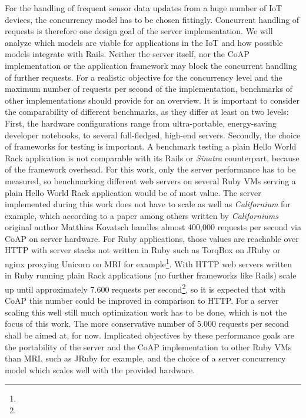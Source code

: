 		For the handling of frequent sensor data updates from a huge number of
		\ac{IoT} devices, the concurrency model has to be chosen fittingly.
		Concurrent handling of requests is therefore one design goal of the
		server implementation. We will analyze which models are viable for
		applications in the \ac{IoT} and how possible models integrate with
		\ac{Rails}. Neither the server itself, nor the \ac{CoAP} implementation
		or the application framework may block the concurrent handling of
		further requests. For a realistic objective for the concurrency level
		and the maximum number of requests per second of the implementation,
		benchmarks of other implementations should provide for an overview. It
		is important to consider the comparability of different benchmarks, as
		they differ at least on two levels: First, the hardware configurations
		range from ultra-portable, energy-saving developer notebooks, to
		several full-fledged, high-end servers. Secondly, the choice of
		frameworks for testing is important. A benchmark testing a plain Hello
		World Rack application is not comparable with its \ac{Rails} or
		\emph{Sinatra} counterpart, because of the framework overhead. For this
		work, only the server performance has to be measured, so benchmarking
		different web servers on several Ruby VMs serving a plain Hello World
		Rack application would be of most value. The server implemented during
		this work does not have to scale as well as \emph{Californium} for
		example, which according to a paper among others written by
		\emph{Californiums} original author Matthias Kovatsch handles almost
		400,000 requests per second \cite{cf-scale} via \ac{CoAP} on server
		hardware. For Ruby applications, those values are reachable over
		\ac{HTTP} with server stacks not written in Ruby such as TorqBox on
		JRuby or nginx proxying Unicorn on \ac{MRI} for
		example\footnote{\urlRubyWebBenchOne}. With \ac{HTTP} web servers
		written in Ruby running plain Rack applications (no further frameworks
		like \ac{Rails}) scale up until approximately 7.600 requests per
		second\footnote{\urlRubyWebBenchTwo}, so it is expected that with
		\ac{CoAP} this number could be improved in comparison to \ac{HTTP}. For
		a server scaling this well still much optimization work has to be done,
		which is not the focus of this work. The more conservative number of
		5.000 requests per second shall be aimed at, for now. Implicated
		objectives by these performance goals are the portability of the server
		and the \ac{CoAP} implementation to other Ruby \acp{VM} than \ac{MRI},
		such as JRuby for example, and the choice of a server concurrency model
		which scales well with the provided hardware.

